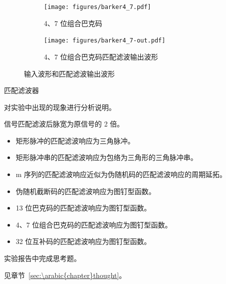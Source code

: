 \documentclass[../main]{subfiles}
\begin{document}
\begin{figure}[htbp]
  \begin{subfigure}[htbp]{0.25\linewidth}
    \centering
    \texttt{[image: figures/barker4\_7.pdf]}
    \caption{4、7 位组合巴克码}%
    \label{fig:barker4_7_}
  \end{subfigure}
  \quad
  \begin{subfigure}[htbp]{0.25\linewidth}
    \centering
    \texttt{[image: figures/barker4\_7-out.pdf]}
    \caption{4、7 位组合巴克码匹配滤波输出波形}%
    \label{fig:barker4_7-out_}
  \end{subfigure}
  \caption{输入波形和匹配滤波输出波形}%
  \label{fig:mf_}
\end{figure}

\begin{table}[htbp]
  \centering
  \caption{匹配滤波器}%
  \label{tab:mf}
\end{table}


\begin{Exercise}
  对实验中出现的现象进行分析说明。
\end{Exercise}

\begin{Answer}
  信号匹配滤波后脉宽为原信号的 2 倍。

  \begin{itemize}
    \item 矩形脉冲的匹配滤波响应为三角脉冲。
    \item 矩形脉冲串的匹配滤波响应为包络为三角形的三角脉冲串。
    \item m 序列的匹配滤波响应近似为伪随机码的匹配滤波响应的周期延拓。
    \item 伪随机截断码的匹配滤波响应为图钉型函数。
    \item 13 位巴克码的匹配滤波响应为图钉型函数。
    \item 4、7 位组合巴克码的匹配滤波响应为图钉型函数。
    \item 32 位互补码的匹配滤波响应为图钉型函数。
  \end{itemize}
\end{Answer}

\begin{Exercise}
  实验报告中完成思考题。
\end{Exercise}

\begin{Answer}
  见章节~\ref{sec:\arabic{chapter}thought}。
\end{Answer}
\end{document}
